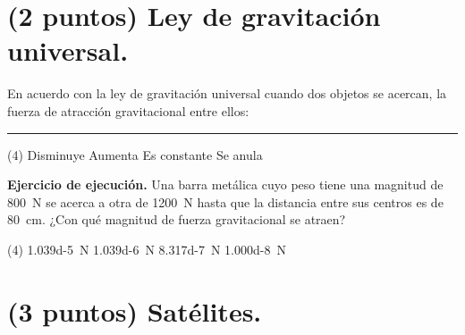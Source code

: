 \documentclass[12pt, letter]{exam}
\begin{document}
\begin{questions}
    \section{(2 puntos) Ley de gravitación universal.}

    \question En acuerdo con la ley de gravitación universal cuando dos objetos se acercan, la fuerza de atracción gravitacional entre ellos: \rule{2cm}{0.1mm}
    \begin{tasks}(4)
        \task Disminuye
        \task Aumenta
        \task Es constante
        \task Se anula
    \end{tasks}
    \question \label{Ejercicio_11} \textbf{Ejercicio de ejecución. } Una barra metálica cuyo peso tiene una magnitud de \SI{800}{\newton} se acerca a otra de \SI{1200}{\newton} hasta que la distancia entre sus centros es de \SI{80}{\centi\meter}. ¿Con qué magnitud de fuerza gravitacional se atraen?
    \begin{tasks}(4)
        \task \SI{1.039d-5}{\newton}
        \task \SI{1.039d-6}{\newton}
        \task \SI{8.317d-7}{\newton}
        \task \SI{1.000d-8}{\newton}
    \end{tasks}

    \newpage

    \section{(3 puntos) Satélites.}


\end{questions}
\end{document}
